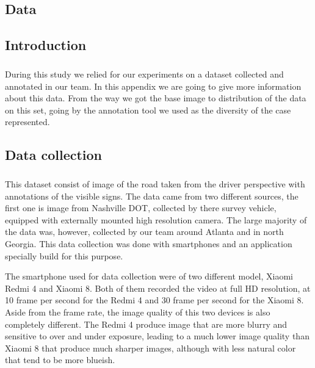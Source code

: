\begin{appendices}



\chapter{Data} \label{data}
\section{Introduction}
\paragraph{}
During this study we relied for our experiments on a dataset collected and annotated in our team. In this appendix we are going to give more information about this data. From the way we got the base image to distribution of the data on this set, going by the annotation tool we used as the diversity of the case represented.

\section{Data collection}
\paragraph{}
This dataset consist of image of the road taken from the driver perspective with annotations of the visible signs. The data came from two different sources, the first one is image from Nashville DOT, collected by there survey vehicle, equipped with externally mounted high resolution camera. The large majority of the data was, however, collected by our team around Atlanta and in north Georgia. This data collection was done with smartphones and an application specially build for this purpose.

The smartphone used for data collection were of two different model, Xiaomi Redmi 4 and Xiaomi 8. Both of them recorded the video at full HD resolution, at 10 frame per second for the Redmi 4 and 30 frame per second for the Xiaomi 8. Aside from the frame rate, the image quality of this two devices is also completely different. The Redmi 4 produce image that are more blurry and sensitive to over and under exposure, leading to a much lower image quality than Xiaomi 8 that produce much sharper images, although with less natural color that tend to be more blueish.


\end{appendices}
